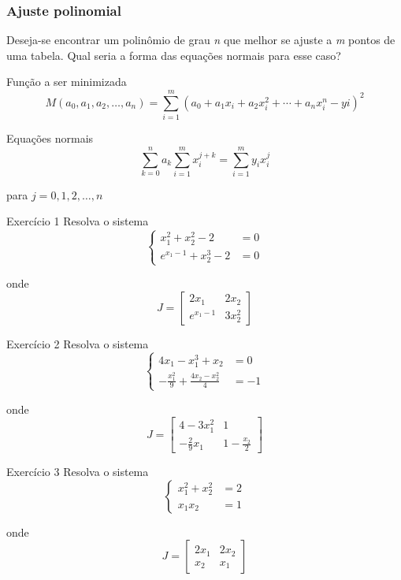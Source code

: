 \begin{frame}
\frametitle{Ajuste polinomial}

Deseja-se encontrar um polinômio de grau \textit{n} que melhor se ajuste a \textit{m} pontos de uma tabela. Qual seria a forma das equações normais para esse caso?

\pause
\begin{block}
{Função a ser minimizada}
\[
M (a_0,a_1, a_2, \ldots, a_n) = \sum_{i=1}^m {\left(
a_0 + a_1 x_i + a_2 x_i^2 + \cdots + a_n x_i^n 
- yi
\right)^2}
\]
\end{block}

\pause
\begin{block}
{Equações normais}
\[
\sum_{k=0}^n a_k {\sum_{i=1}^m {x_i^{j+k}}} = \sum_{i=1}^m {y_i x_i^j}
\]

para \(j=0, 1, 2, \ldots, n\)
\end{block}

\end{frame}

\begin{frame}{Exercício 1}
Resolva o sistema
\[
\begin{cases}
x_1^2 +x_2^2-2 &= 0 \\
e^{x_1-1}+x_2^3-2 & = 0
\end{cases}
\]

onde 
\[
J=
\begin{bmatrix}
2x_1 & 2x_2 \\
e^{x_1-1} & 3x_2^2
\end{bmatrix}
\]
    
\end{frame}

\begin{frame}{Exercício 2}
Resolva o sistema
\[
\begin{cases}
4x_1 - x_1^3+x_2 &= 0 \\
-\frac{x_1^2}{9} + \frac{4x_2 - x_2^2}{4} & = -1
\end{cases}
\]

onde 
\[
J=
\begin{bmatrix}
4-3x_1^2 & 1 \\
-\frac{2}{9}x_1 & 1-\frac{x_2}{2}
\end{bmatrix}
\]
    
\end{frame}

\begin{frame}{Exercício 3}
Resolva o sistema
\[
\begin{cases}
x_1^2+x_2^2&=2 \\
x_1 x_2 &=1
\end{cases}
\]

onde 
\[
J=
\begin{bmatrix}
2x_1 & 2x_2 \\
x_2 & x_1
\end{bmatrix}
\]
    
\end{frame}

